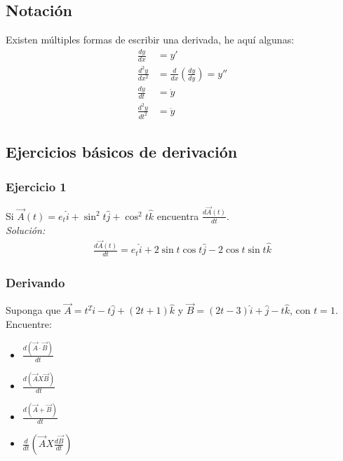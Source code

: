 \documentclass[12pt,openany]{book}
\begin{document}
		\subsection{Notaci\'on}
			Existen m\'ultiples formas de escribir una derivada, he aqu\'i algunas:
			\begin{equation*}
				\begin{split}
					\frac{dy}{dx}&=y'														\\
					\frac{d^{2}y}{dx^{2}}&=\frac{d}{dx}\left(\frac{dy}{dy}\right)=y''		\\
					\frac{dy}{dt}&=\dot y 													\\
					\frac{d^{2}y}{dt^{2}}&=\ddot{y} 
				\end{split}
			\end{equation*}
				
		\subsection{Ejercicios b\'asicos de derivaci\'on}

			\subsubsection{Ejercicio 1}
				Si $\vec{A}(t)=e_{t}\hat{i}+\sin^{2}t\hat{j}+\cos^{2}t\hat{k}$ encuentra $\frac{d\vec{A}(t)}{dt}$.\\
				\noindent\textsl{Soluci\'on:}\\
				\begin{equation*}
					\begin{split}
						\frac{d\vec{A}(t)}{dt}=e_{t}\hat{i}+2\sin t\cos t\hat{j}-2\cos t\sin t\hat{k}
					\end{split}
				\end{equation*}

			\subsubsection{\¡Derivando\!}
				Suponga que $\vec{A}=t^{2}\hat{i}-t\hat{j}+(2t+1)\hat{k}$ y $\vec{B}=(2t-3)\hat{i}+\hat{j}-t\hat{k}$, con
				$t=1$.
				Encuentre: 
				\begin{multicols}{4}
					\begin{itemize}
						\item $\frac{d(\vec{A}\cdot\vec{B})}{dt}$
				\breakcolumn
						\item $\frac{d(\vec{A}X\vec{B})}{dt}$
		 		\breakcolumn
		 				\item $\frac{d(\vec{A}+\vec{B})}{dt}$
		 		\breakcolumn
		 				\item $\frac{d}{dt}\left(\vec{A}X\frac{d\vec{B}}{dt}\right)$
					\end{itemize}
				\end{multicols}
\end{document}
